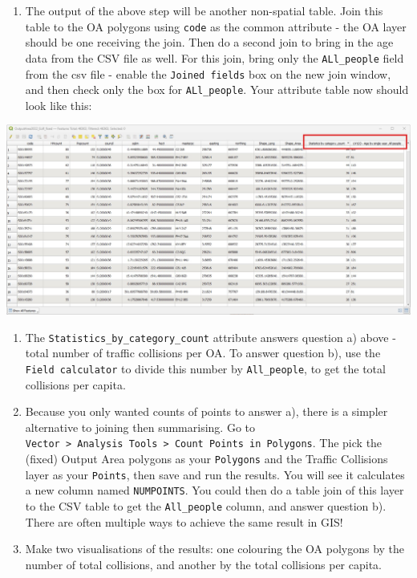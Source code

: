 \documentclass[
  letterpaper,
  DIV=11,
  numbers=noendperiod]{scrreprt}
\providecommand{\tightlist}{%
  \setlength{\itemsep}{0pt}\setlength{\parskip}{0pt}}\usepackage{longtable,booktabs,array}
\begin{document}
\begin{enumerate}
\def\labelenumi{\arabic{enumi})}
\setcounter{enumi}{5}
\tightlist
\item
  The output of the above step will be another non-spatial table. Join
  this table to the OA polygons using \texttt{code} as the common
  attribute - the OA layer should be one receiving the join. Then do a
  second join to bring in the age data from the CSV file as well. For
  this join, bring only the \texttt{ALl\_people} field from the csv file
  - enable the \texttt{Joined\ fields} box on the new join window, and
  then check only the box for \texttt{ALl\_people}. Your attribute table
  now should look like this:
\end{enumerate}

\includegraphics{images/lab_11/lab_11_fig_7_double_join.jpg}

\begin{enumerate}
\def\labelenumi{\arabic{enumi})}
\setcounter{enumi}{6}
\item
  The \texttt{Statistics\_by\_category\_count} attribute answers
  question a) above - total number of traffic collisions per OA. To
  answer question b), use the \texttt{Field\ calculator} to divide this
  number by \texttt{All\_people}, to get the total collisions per
  capita.
\item
  Because you only wanted counts of points to answer a), there is a
  simpler alternative to joining then summarising. Go to
  \texttt{Vector\ \textgreater{}\ Analysis\ Tools\ \textgreater{}\ Count\ Points\ in\ Polygons}.
  The pick the (fixed) Output Area polygons as your \texttt{Polygons}
  and the Traffic Collisions layer as your \texttt{Points}, then save
  and run the results. You will see it calculates a new column named
  \texttt{NUMPOINTS}. You could then do a table join of this layer to
  the CSV table to get the \texttt{All\_people} column, and answer
  question b). There are often multiple ways to achieve the same result
  in GIS!
\item
  Make two visualisations of the results: one colouring the OA polygons
  by the number of total collisions, and another by the total collisions
  per capita.
\end{enumerate}
\end{document}
